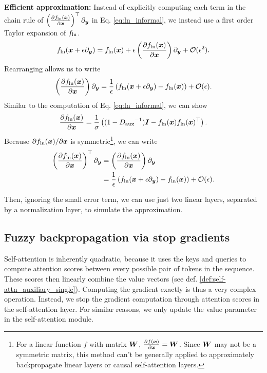 \textbf{Efficient approximation:} 
Instead of explicitly computing each term in the chain rule of $\left(\frac{\partial f_{\text{ln}} ({\bm{x}})}{\partial {\bm{x}}} \right)^{\top} \partial_{{\bm{y}}}$ in Eq. \ref{eq:ln_informal}, we instead use a first order Taylor expansion of $f_{\text{ln}}$.
\begin{align*}
    f_{\text{ln}}({\bm{x}} + \epsilon \partial_{{\bm{y}}}) = f_{\text{ln}}({\bm{x}}) + \epsilon \left(\frac{\partial f_{\text{ln}} ({\bm{x}})}{\partial {\bm{x}}} \right) \partial_{{\bm{y}}} + \mathcal{O}(\epsilon^2).
\end{align*}
Rearranging allows us to write
\begin{align*}
    \left(\frac{\partial f_{\text{ln}} ({\bm{x}})}{\partial {\bm{x}}} \right) \partial_{{\bm{y}}} =  \frac{1}{\epsilon} \left( f_{\text{ln}} ({\bm{x}} + \epsilon \partial_{{\bm{y}}}) - f_{\text{ln}} ({\bm{x}}) \right) + \mathcal{O}(\epsilon).
\end{align*}
Similar to the computation of Eq. \ref{eq:ln_informal}, we can show  
\begin{align*}
    \frac{\partial f_{\text{ln}} ({\bm{x}})}{\partial {\bm{x}}} = \frac{1}{\sigma} \left( (1-{D_{\text{aux}}}^{-1}){\bm{I}} - f_{\text{ln}}({\bm{x}}) f_{\text{ln}}({\bm{x}})^{\top} \right).
\end{align*}
Because  $\partial f_{\text{ln}} ({\bm{x}}) / \partial {\bm{x}}$ is symmetric\footnote{For a linear function $f$ with matrix ${\bm{W}}$, $\frac{\partial f ({\bm{x}})}{\partial {\bm{x}}} = {\bm{W}}$. Since ${\bm{W}}$ may not be a symmetric matrix, this method can't be generally applied to approximately backpropagate linear layers or causal self-attention layers.}, we can write
\begin{align*}
    \left(\frac{\partial f_{\text{ln}} ({\bm{x}})}{\partial {\bm{x}}} \right)^{\top} \partial_{{\bm{y}}} & =  \left(\frac{\partial f_{\text{ln}} ({\bm{x}})}{\partial {\bm{x}}} \right) \partial_{{\bm{y}}} \\& =  \frac{1}{\epsilon} \left( f_{\text{ln}} ({\bm{x}} + \epsilon \partial_{{\bm{y}}}) - f_{\text{ln}} ({\bm{x}}) \right) + \mathcal{O}(\epsilon).
\end{align*}



Then, ignoring the small error term, we can use just two linear layers, separated by a normalization layer, to simulate the approximation. 


\subsection{Fuzzy backpropagation via stop gradients} \label{sec:stop_gradients}
Self-attention is inherently quadratic, because it uses the keys and queries to compute attention scores between every possible pair of tokens in the sequence.
These scores then linearly combine the value vectors (see def. \ref{def:self-attn_auxiliary_single}). 
Computing the gradient exactly is thus a very complex operation.
Instead, we stop the gradient computation through attention scores in the self-attention layer. 
For similar reasons, we only update the value parameter in the self-attention module.

